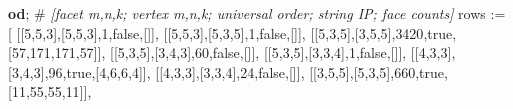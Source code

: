 \documentclass[
  11pt,
  a4paper,
]{article}
\newenvironment{Shaded}{}{}
\newcommand{\CommentTok}[1]{\textcolor[rgb]{0.38,0.63,0.69}{\textit{#1}}}
\newcommand{\ConstantTok}[1]{\textcolor[rgb]{0.53,0.00,0.00}{#1}}
\newcommand{\ControlFlowTok}[1]{\textcolor[rgb]{0.00,0.44,0.13}{\textbf{#1}}}
\newcommand{\FloatTok}[1]{\textcolor[rgb]{0.25,0.63,0.44}{#1}}
\newcommand{\NormalTok}[1]{#1}
\newcommand{\OperatorTok}[1]{\textcolor[rgb]{0.40,0.40,0.40}{#1}}
\newcommand{\VariableTok}[1]{\textcolor[rgb]{0.10,0.09,0.49}{#1}}
\begin{document}
\begin{Shaded}
\begin{Highlighting}[]
\ControlFlowTok{od}\OperatorTok{;}
\NormalTok{\#}\CommentTok{ [facet m,n,k; vertex m,n,k; universal order; string IP; face counts]}
\VariableTok{rows} \OperatorTok{:=}\NormalTok{ [}
\NormalTok{ [[}\FloatTok{5}\OperatorTok{,}\FloatTok{5}\OperatorTok{,}\FloatTok{3}\NormalTok{]}\OperatorTok{,}\NormalTok{[}\FloatTok{5}\OperatorTok{,}\FloatTok{5}\OperatorTok{,}\FloatTok{3}\NormalTok{]}\OperatorTok{,}\FloatTok{1}\OperatorTok{,}\ConstantTok{false}\OperatorTok{,}\NormalTok{[]]}\OperatorTok{,}
\NormalTok{ [[}\FloatTok{5}\OperatorTok{,}\FloatTok{5}\OperatorTok{,}\FloatTok{3}\NormalTok{]}\OperatorTok{,}\NormalTok{[}\FloatTok{5}\OperatorTok{,}\FloatTok{3}\OperatorTok{,}\FloatTok{5}\NormalTok{]}\OperatorTok{,}\FloatTok{1}\OperatorTok{,}\ConstantTok{false}\OperatorTok{,}\NormalTok{[]]}\OperatorTok{,}
\NormalTok{ [[}\FloatTok{5}\OperatorTok{,}\FloatTok{3}\OperatorTok{,}\FloatTok{5}\NormalTok{]}\OperatorTok{,}\NormalTok{[}\FloatTok{3}\OperatorTok{,}\FloatTok{5}\OperatorTok{,}\FloatTok{5}\NormalTok{]}\OperatorTok{,}\FloatTok{3420}\OperatorTok{,}\ConstantTok{true}\OperatorTok{,}\NormalTok{[}\FloatTok{57}\OperatorTok{,}\FloatTok{171}\OperatorTok{,}\FloatTok{171}\OperatorTok{,}\FloatTok{57}\NormalTok{]]}\OperatorTok{,}
\NormalTok{ [[}\FloatTok{5}\OperatorTok{,}\FloatTok{3}\OperatorTok{,}\FloatTok{5}\NormalTok{]}\OperatorTok{,}\NormalTok{[}\FloatTok{3}\OperatorTok{,}\FloatTok{4}\OperatorTok{,}\FloatTok{3}\NormalTok{]}\OperatorTok{,}\FloatTok{60}\OperatorTok{,}\ConstantTok{false}\OperatorTok{,}\NormalTok{[]]}\OperatorTok{,}
\NormalTok{ [[}\FloatTok{5}\OperatorTok{,}\FloatTok{3}\OperatorTok{,}\FloatTok{5}\NormalTok{]}\OperatorTok{,}\NormalTok{[}\FloatTok{3}\OperatorTok{,}\FloatTok{3}\OperatorTok{,}\FloatTok{4}\NormalTok{]}\OperatorTok{,}\FloatTok{1}\OperatorTok{,}\ConstantTok{false}\OperatorTok{,}\NormalTok{[]]}\OperatorTok{,}
\NormalTok{ [[}\FloatTok{4}\OperatorTok{,}\FloatTok{3}\OperatorTok{,}\FloatTok{3}\NormalTok{]}\OperatorTok{,}\NormalTok{[}\FloatTok{3}\OperatorTok{,}\FloatTok{4}\OperatorTok{,}\FloatTok{3}\NormalTok{]}\OperatorTok{,}\FloatTok{96}\OperatorTok{,}\ConstantTok{true}\OperatorTok{,}\NormalTok{[}\FloatTok{4}\OperatorTok{,}\FloatTok{6}\OperatorTok{,}\FloatTok{6}\OperatorTok{,}\FloatTok{4}\NormalTok{]]}\OperatorTok{,}
\NormalTok{ [[}\FloatTok{4}\OperatorTok{,}\FloatTok{3}\OperatorTok{,}\FloatTok{3}\NormalTok{]}\OperatorTok{,}\NormalTok{[}\FloatTok{3}\OperatorTok{,}\FloatTok{3}\OperatorTok{,}\FloatTok{4}\NormalTok{]}\OperatorTok{,}\FloatTok{24}\OperatorTok{,}\ConstantTok{false}\OperatorTok{,}\NormalTok{[]]}\OperatorTok{,}
\NormalTok{ [[}\FloatTok{3}\OperatorTok{,}\FloatTok{5}\OperatorTok{,}\FloatTok{5}\NormalTok{]}\OperatorTok{,}\NormalTok{[}\FloatTok{5}\OperatorTok{,}\FloatTok{3}\OperatorTok{,}\FloatTok{5}\NormalTok{]}\OperatorTok{,}\FloatTok{660}\OperatorTok{,}\ConstantTok{true}\OperatorTok{,}\NormalTok{[}\FloatTok{11}\OperatorTok{,}\FloatTok{55}\OperatorTok{,}\FloatTok{55}\OperatorTok{,}\FloatTok{11}\NormalTok{]]}\OperatorTok{,}

\end{Highlighting}
\end{Shaded}
\end{document}
